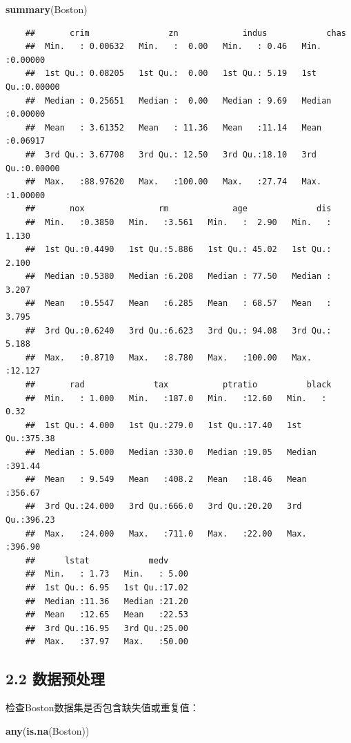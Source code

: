 \documentclass[UTF-8]{ctexart}
\newenvironment{Shaded}{\begin{snugshade}}{\end{snugshade}}
\newcommand{\KeywordTok}[1]{\textcolor[rgb]{0.13,0.29,0.53}{\textbf{#1}}}
\newcommand{\NormalTok}[1]{#1}
\begin{document}
	\begin{Shaded}
	\begin{Highlighting}[]
\KeywordTok{summary}\NormalTok{(Boston)}
	\end{Highlighting}
	\end{Shaded}
	
	\begin{verbatim}
	##       crim                zn             indus            chas        
	##  Min.   : 0.00632   Min.   :  0.00   Min.   : 0.46   Min.   :0.00000  
	##  1st Qu.: 0.08205   1st Qu.:  0.00   1st Qu.: 5.19   1st Qu.:0.00000  
	##  Median : 0.25651   Median :  0.00   Median : 9.69   Median :0.00000  
	##  Mean   : 3.61352   Mean   : 11.36   Mean   :11.14   Mean   :0.06917  
	##  3rd Qu.: 3.67708   3rd Qu.: 12.50   3rd Qu.:18.10   3rd Qu.:0.00000  
	##  Max.   :88.97620   Max.   :100.00   Max.   :27.74   Max.   :1.00000  
	##       nox               rm             age              dis        
	##  Min.   :0.3850   Min.   :3.561   Min.   :  2.90   Min.   : 1.130  
	##  1st Qu.:0.4490   1st Qu.:5.886   1st Qu.: 45.02   1st Qu.: 2.100  
	##  Median :0.5380   Median :6.208   Median : 77.50   Median : 3.207  
	##  Mean   :0.5547   Mean   :6.285   Mean   : 68.57   Mean   : 3.795  
	##  3rd Qu.:0.6240   3rd Qu.:6.623   3rd Qu.: 94.08   3rd Qu.: 5.188  
	##  Max.   :0.8710   Max.   :8.780   Max.   :100.00   Max.   :12.127  
	##       rad              tax           ptratio          black       
	##  Min.   : 1.000   Min.   :187.0   Min.   :12.60   Min.   :  0.32  
	##  1st Qu.: 4.000   1st Qu.:279.0   1st Qu.:17.40   1st Qu.:375.38  
	##  Median : 5.000   Median :330.0   Median :19.05   Median :391.44  
	##  Mean   : 9.549   Mean   :408.2   Mean   :18.46   Mean   :356.67  
	##  3rd Qu.:24.000   3rd Qu.:666.0   3rd Qu.:20.20   3rd Qu.:396.23  
	##  Max.   :24.000   Max.   :711.0   Max.   :22.00   Max.   :396.90  
	##      lstat            medv      
	##  Min.   : 1.73   Min.   : 5.00  
	##  1st Qu.: 6.95   1st Qu.:17.02  
	##  Median :11.36   Median :21.20  
	##  Mean   :12.65   Mean   :22.53  
	##  3rd Qu.:16.95   3rd Qu.:25.00  
	##  Max.   :37.97   Max.   :50.00
	\end{verbatim}
	
	\subsection{2.2 数据预处理}
	检查Boston数据集是否包含缺失值或重复值：
	
	\begin{Shaded}
		\begin{Highlighting}[]
\KeywordTok{any}\NormalTok{(}\KeywordTok{is.na}\NormalTok{(Boston))}
		\end{Highlighting}
	\end{Shaded}
	
\end{document}
